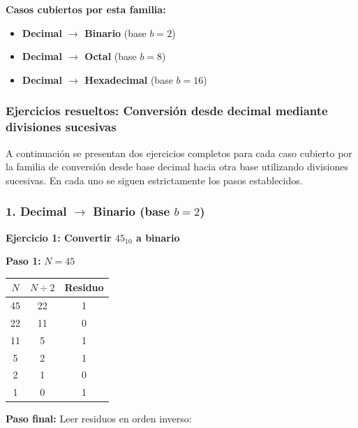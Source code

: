\documentclass[12pt,twoside]{book}
\begin{document}
						\noindent
						\textbf{Casos cubiertos por esta familia:}
						\begin{itemize}
							\item \textbf{Decimal $\rightarrow$ Binario} (base $b=2$)
							\item \textbf{Decimal $\rightarrow$ Octal} (base $b=8$)
							\item \textbf{Decimal $\rightarrow$ Hexadecimal} (base $b=16$)
						\end{itemize}
						
						\subsubsection*{Ejercicios resueltos: Conversión desde decimal mediante divisiones sucesivas}
						
						\noindent	
						A continuación se presentan dos ejercicios completos para cada caso cubierto por la familia de conversión desde base decimal hacia otra base utilizando divisiones sucesivas. En cada uno se siguen estrictamente los pasos establecidos.
						
						\subsubsection*{1. Decimal $\rightarrow$ Binario (base $b=2$)}
						
						\noindent
						\textbf{Ejercicio 1: Convertir $45_{10}$ a binario}
						
						\noindent
						\textbf{Paso 1:} $N = 45$
						
						\begin{center}
							\begin{tabular}{c|c|c}
								$N$ & $N \div 2$ & Residuo \\
								\hline
								45 & 22 & 1 \\
								22 & 11 & 0 \\
								11 & 5  & 1 \\
								5  & 2  & 1 \\
								2  & 1  & 0 \\
								1  & 0  & 1 \\
							\end{tabular}
						\end{center}
						
						\noindent
						\textbf{Paso final:} Leer residuos en orden inverso:
						
\end{document}
